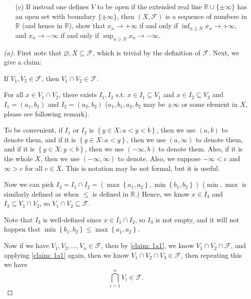 \begin{problem}[20pts]
\begin{enumerate}
 
 \medskip
\item[(c)] If instead one defines $V$ to be open if the extended real line $\mathbb{R} \cup \{\pm \infty\}$ has an open set with boundary $\{\pm \infty\}$, then $(X, \mathcal{F})$ is a sequence of numbers in $\mathbb{R}$ (and hence in $\mathbb{R}$), show that $x_n \to +\infty$ if and only if $\inf_{n \geq N} x_n \to +\infty$, and $x_n \to -\infty$ if and only if $\sup_{n \geq N} x_n \to -\infty$.

  \end{enumerate}
\end{problem}
\begin{proof}[(a)]
  First note that \(\varnothing , X \subseteq \mathcal{F} \), which is trivial by the definition of \(\mathcal{F} \). Next, we give a claim:
  \begin{claim} \label{claim: 1a1}
    If \(V_1, V_2 \in \mathcal{F} \), then \(V_1 \cap V_2 \in \mathcal{F} \).  
  \end{claim}
  \begin{explanation}
    For all \(x \in V_1 \cap V_2\), there exists \(I_1, I_2\) s.t. \(x \in I_1 \subseteq V_1\) and \(x \in I_2 \subseteq V_2\) and \(I_1 = (a_1, b_1)\) and \(I_2 = (a_2, b_2)\) (\(a_1, b_1, a_2, b_2\) may be \(\pm \infty \) or some element in \(X\), please see following remark).  
    \begin{remark} \label{rmk: 1a1}
      To be convenient, if \(I_1\) or \(I_2\) is \(\left\{ y \in X: a < y < b \right\} \), then we use \((a, b)\) to denote them, and if it is \(\left\{ y \in X: a < y \right\} \), then we use \((a, \infty )\) to denote them, and if it is \(\left\{ y \in X: y < b \right\} \), then we use \((-\infty , b)\) to denote them. Also, if it is the whole \(X\), then we use \((-\infty , \infty )\) to denote. Also, we suppose \(-\infty < c\) and \(\infty > c\) for all \(c \in X\). This is notation may be not formal, but it is useful.       
    \end{remark}
    Now we can pick \(I_3 = I_1 \cap I_2 = \left( \max \left\{ a_1, a_2 \right\}, \min \left\{ b_1, b_2 \right\}   \right) \) (\(\min , \max \) is similarly defined as when \(\le\) is defined in \(\mathbb{R} \).) Hence, we know \(x \in I_3\) and \(I_3 \subseteq V_1 \cap V_2\), so \(V_1 \cap V_2 \subseteq \mathcal{F} \).  

      Note that \(I_3\) is well-defined since \(x \in I_1 \cap I_2\), so \(I_3\) is not empty, and it will not happen that \(\min \left\{ b_1, b_2 \right\} \le \max \left\{ a_1, a_2 \right\}  \).    
  \end{explanation}
  Now if we have \(V_1, V_2, \dots , V_n \in \mathcal{F} \), then by \autoref{claim: 1a1}, we know \(V_1 \cap V_2 \cap \mathcal{F} \), and applying \autoref{claim: 1a1} again, then we know \(V_1 \cap V_2 \cap V_3 \in \mathcal{F} \), then repeating this we have 
  \[
    \bigcap_{i=1}^n V_i \in \mathcal{F} . 
  \]   
  

\end{proof}
